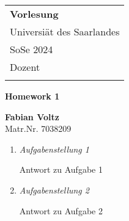 \documentclass[a4paper,12pt]{article}
\begin{document}
\thispagestyle{empty} %

\begin{tabular}{p{15.5cm}}
{\large \bf Vorlesung} \\
Universiät des Saarlandes \\ SoSe 2024\\ Dozent\\
\hline \\
\end{tabular}

\vspace*{0.3cm} 

\begin{center}
	{\Large \bf Homework 1}
	\vspace{2mm}
	
  \textbf{Fabian Voltz}\\
  \small{Matr.Nr. 7038209}
		
\end{center}  

\vspace{0.4cm}


\begin{enumerate}

\item {\it Aufgabenstellung 1}

Antwort zu Aufgabe 1


\newpage 
\item {\it Aufgabenstellung 2}

Antwort zu Aufgabe 2

\end{enumerate}
\end{document}
